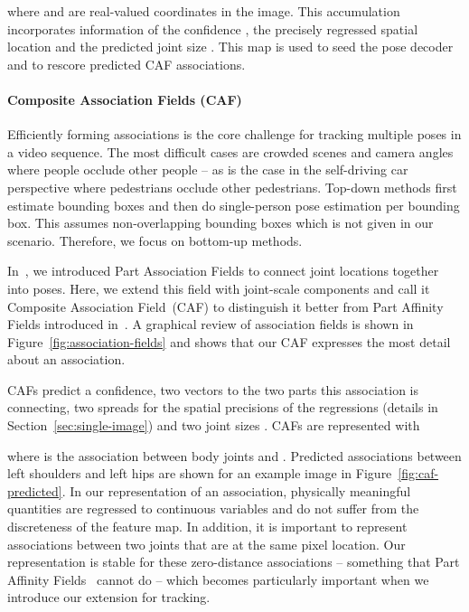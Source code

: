 \documentclass[journal]{IEEEtran}
\begin{document}
where  and  are real-valued coordinates in the image.
This accumulation incorporates information of the confidence , the precisely
regressed spatial location  and the predicted joint size .
This map  is used to seed the pose decoder and to rescore predicted
CAF associations.


\paragraph{Composite Association Fields (CAF)}

Efficiently forming associations is the core challenge for
tracking multiple poses in a video sequence. The most difficult
cases are crowded scenes and camera angles where people occlude
other people -- as is the case in the self-driving car perspective
where pedestrians occlude other pedestrians.
Top-down methods first estimate bounding boxes and then do
single-person pose estimation per bounding box. This assumes
non-overlapping bounding boxes which is not given in our scenario.
Therefore, we focus on bottom-up methods.

In~\cite{kreiss2019pifpaf}, we introduced Part Association Fields
to connect joint locations together into poses.
Here, we extend this field with joint-scale components and call
it Composite Association Field~(CAF) to distinguish it better from
Part Affinity Fields introduced in~\cite{cao2017realtime}.
A graphical review of association fields is shown in
Figure~\ref{fig:association-fields} and shows that our CAF
expresses the most detail about an association.

CAFs predict a confidence, two vectors to the two parts this association is
connecting, two spreads  for the spatial precisions of the regressions
(details in Section~\ref{sec:single-image}) and two joint sizes .
CAFs are represented with

where  is the association between body joints  and .
Predicted associations between left shoulders
and left hips are shown for an example image in Figure~\ref{fig:caf-predicted}.
In our representation of an association, physically meaningful
quantities are regressed to continuous variables and do not
suffer from the discreteness of the feature map.
In addition, it is important to represent associations between two joints that are at the same pixel location. Our representation
is stable for these zero-distance associations -- something that
Part Affinity Fields~\cite{cao2017realtime} cannot do -- which
becomes particularly important when we introduce our extension for
tracking.
\end{document}
